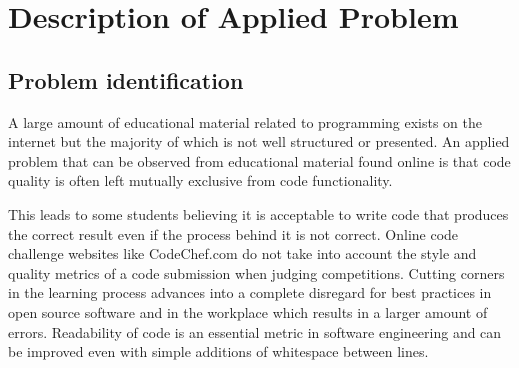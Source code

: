 \documentclass{article}
\begin{document}


\begin{abstract} 
{\bf Discovering the effects of code style on code functionality and problem
structure.} This study aims to showcase how well formatted, reusable and
maintainable code is fundamentally better in all circumstances by
looking at over 1 million results from a competitive programming website
and analyzing the correlation between question and solution. The goal is
to promote code quality checking in online `just in time' teaching
resources to improve the performance of interviewers, researchers, and
students. \end{abstract} 


\section{Description of Applied
Problem}\label{description-of-applied-problem}

\subsection{Problem identification}\label{problem-identification}

A large amount of educational material related to programming exists on
the internet but the majority of which is not well structured or
presented. An applied problem that can be observed from educational
material found online is that code quality is often left mutually
exclusive from code functionality. \citet{justintimeteaching}

This leads to some students believing it is acceptable to write code
that produces the correct result even if the process behind it is not
correct. Online code challenge websites like CodeChef.com do not take
into account the style and quality metrics of a code submission when
judging competitions. \citet{codechef} Cutting corners in the learning
process advances into a complete disregard for best practices in open
source software and in the workplace which results in a larger amount of
errors. Readability of code is an essential metric in software
engineering and can be improved even with simple additions of whitespace
between lines. \citet{codereadability}
\end{document}
